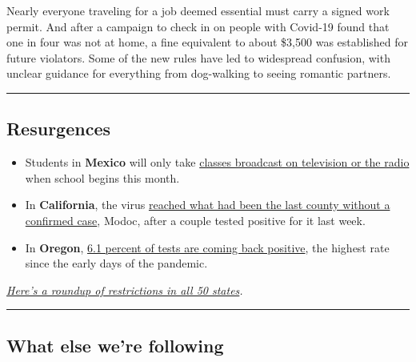 Nearly everyone traveling for a job deemed essential must carry a signed
work permit. And after a campaign to check in on people with Covid-19
found that one in four was not at home, a fine equivalent to about
\$3,500 was established for future violators. Some of the new rules have
led to widespread confusion, with unclear guidance for everything from
dog-walking to seeing romantic partners.

\begin{center}\rule{0.5\linewidth}{\linethickness}\end{center}

\hypertarget{resurgences}{%
\subsection{Resurgences}\label{resurgences}}

\begin{itemize}
\item
  Students in \textbf{Mexico} will only take
  \href{https://www.nytimes3xbfgragh.onion/2020/08/04/world/coronavirus-cases.html\#link-18bf040e}{classes
  broadcast on television or the radio} when school begins this month.
\item
  In \textbf{California}, the virus
  \href{https://www.nytimes3xbfgragh.onion/2020/08/04/world/coronavirus-cases.html\#link-6031871d}{reached
  what had been the last county without a confirmed case}, Modoc, after
  a couple tested positive for it last week.
\item
  In \textbf{Oregon},
  \href{https://www.oregonlive.com/coronavirus/2020/08/coronavirus-in-oregon-positive-test-rate-climbs-to-61-highest-in-four-months.html?outputType=amp}{6.1
  percent of tests are coming back positive}, the highest rate since the
  early days of the pandemic.
\end{itemize}

\href{https://www.nytimes3xbfgragh.onion/interactive/2020/us/states-reopen-map-coronavirus.html}{\emph{Here's
a roundup of restrictions in all 50 states}}\emph{.}

\begin{center}\rule{0.5\linewidth}{\linethickness}\end{center}

\hypertarget{what-else-were-following}{%
\subsection{What else we're following}\label{what-else-were-following}}


